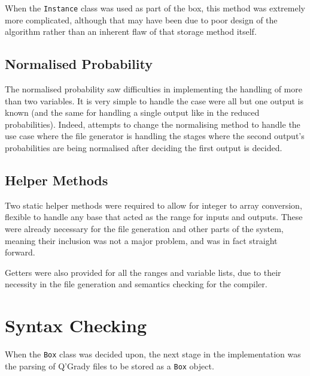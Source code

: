\documentclass[report.tex]{subfiles}
\begin{document}
When the \texttt{Instance} class was used as part of the box, this method was
extremely more complicated, although that may have been due to poor design of
the algorithm rather than an inherent flaw of that storage method itself.

\subsection{Normalised Probability} %
\label{sub:normalised_probability}
The normalised probability saw difficulties in implementing the handling of more
than two variables. It is very simple to handle the case were all but one output
is known (and the same for handling a single output like in the reduced
probabilities). Indeed, attempts to change the normalising method to handle the
use case where the file generator is handling the stages where the second
output's probabilities are being normalised after deciding the first output is
decided.

 


\subsection{Helper Methods} %
\label{sub:helper_methods}
Two static helper methods were required to allow for integer to array
conversion, flexible to handle any base that acted as the range for inputs and
outputs. These were already necessary for the file generation and other parts
of the system, meaning their inclusion was not a major problem, and was in fact
straight forward.

Getters were also provided for all the ranges and variable lists, due to their
necessity in the file generation and semantics checking for the compiler.

\section{Syntax Checking} %
\label{sec:syntax_checking}
When the \texttt{Box} class was decided upon, the next stage in the
implementation was the parsing of Q'Grady files to be stored as a \texttt{Box}
object.
\end{document}
